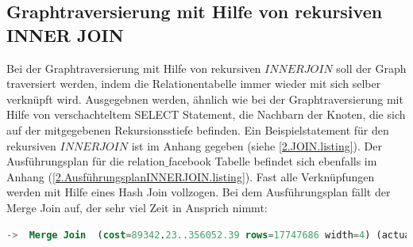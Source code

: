 \subsection{Graphtraversierung mit Hilfe von rekursiven INNER JOIN}
\label{2.postgresInnerJoin.subsection}
Bei der Graphtraversierung mit Hilfe von rekursiven $INNER JOIN$ soll der Graph traversiert werden, indem die Relationentabelle immer wieder mit sich selber verknüpft wird.
Ausgegebnen werden, ähnlich wie bei der Graphtraversierung mit Hilfe von verschachteltem SELECT Statement, die Nachbarn der Knoten, die sich auf der mitgegebenen Rekursionsstiefe befinden.
Ein Beispielstatement für den rekursiven $INNER JOIN$ ist im Anhang gegeben (siehe \ref{2.JOIN.listing}).
Der Ausführungsplan für die relation$\_$facebook Tabelle befindet sich ebenfalls im Anhang (\ref{2.AusführungsplanINNERJOIN.listing}).
Fast alle Verknüpfungen werden mit Hilfe eines Hash Join vollzogen.
Bei dem Ausführungsplan fällt der Merge Join auf, der sehr viel Zeit in Ansprich nimmt:
\begin{lstlisting}[language=SQL,caption = Merge JOIN,frame=single, label={2.mergeJoin.listing} ]
    ->  Merge Join  (cost=89342.23..356052.39 rows=17747686 width=4) (actual time=112.509..1178.121 rows=8863706 loops=1)
\end{lstlisting}

